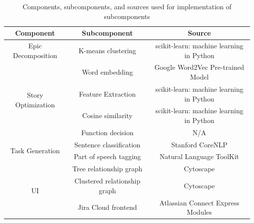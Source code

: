 \begin{table}
\centering
\caption{Components, subcomponents, and sources used for implementation of subcomponents}
\begin{tabular}{ |c|c|c| } 
\hline
\multicolumn{1}{|c|}{\textbf{Component}} & \multicolumn{1}{c|}{\textbf{Subcomponent}} & \multicolumn{1}{c|}{\textbf{Source}} \\
\hline
Epic Decomposition & K-means clustering & scikit-learn: machine learning in Python \cite{scikit} \\
\hline
\multirow{4}{*}{Story Optimization} & Word embedding & Google Word2Vec Pre-trained Model \cite{googleword2vec} \\ 
\cline{2-3}
& Feature Extraction & scikit-learn: machine learning in Python \cite{scikit} \\ 
\cline{2-3}
& Cosine similarity & scikit-learn: machine learning in Python \cite{scikit} \\
\cline{2-3}
& Function decision & N/A \\ 
\hline
\multirow{2}{*}{Task Generation} & Sentence classification & Stanford CoreNLP \cite{NLP1} \\ 
\cline{2-3}
& Part of speech tagging & Natural Language ToolKit \cite{nltk} \\ 
\hline
\multirow{3}{*}{UI} & Tree relationship graph & Cytoscape \cite{cytoscape} \\ 
\cline{2-3}
& Clustered relationship graph & Cytoscape \cite{cytoscape} \\ 
\cline{2-3}
& Jira Cloud frontend & Atlassian Connect Express Modules \cite{jiraconnect}\\ 
\hline
\end{tabular}
\end{table}
